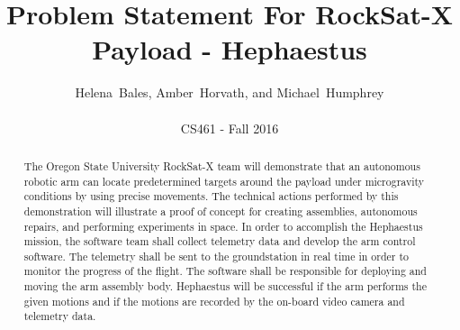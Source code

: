 \documentclass[letterpaper,10pt]{article}
\title{Problem Statement For RockSat-X Payload - Hephaestus}
\author{Helena~Bales, Amber~Horvath, and Michael~Humphrey\\ \\ CS461 - Fall 2016}
\begin{document}
\maketitle

\begin{abstract}
The Oregon State University RockSat-X team will demonstrate that an autonomous robotic arm can
locate predetermined targets around the payload under microgravity conditions by using precise
movements. The technical actions performed by this demonstration will illustrate a proof of concept
for creating assemblies, autonomous repairs, and performing experiments in space. In order to
accomplish the Hephaestus mission, the software team shall collect telemetry data and develop the arm
control software. The telemetry shall be sent to the groundstation in real time in order to monitor 
the progress of the flight. The software shall be responsible for deploying and moving the arm 
assembly body. Hephaestus will be successful if the arm performs the given motions and if the motions
 are recorded by the on-board video camera and telemetry data.
\end{abstract}

\clearpage

\section{}
\end{document}
